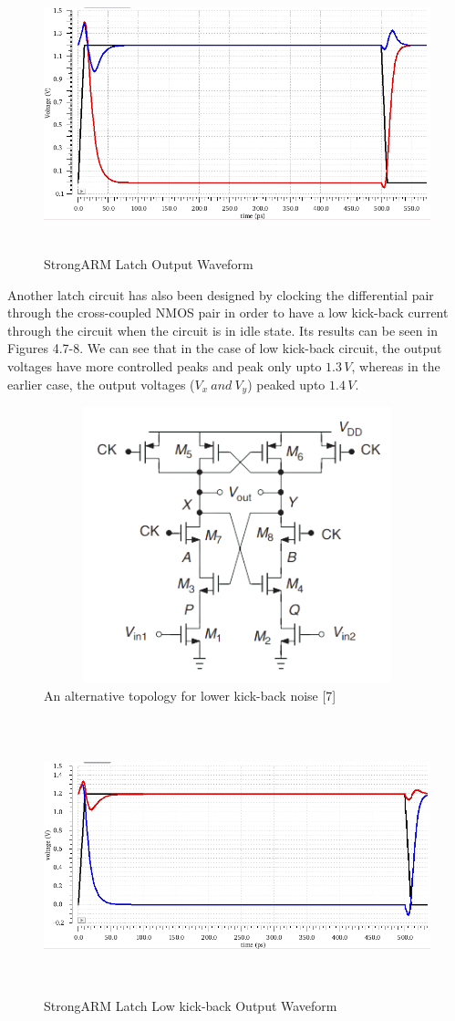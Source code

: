 \begin{figure}[h]
	\centering
	\includegraphics[width=16cm,height=8cm]{fig4_6.png}
	\caption{StrongARM Latch Output Waveform}
	\label{comp_waveform}
\end{figure}

Another latch circuit has also been designed by clocking the differential pair through the cross-coupled NMOS pair in order to have a low kick-back current through the circuit when the circuit is in idle state. Its results can be seen in Figures 4.7-8. We can see that in the case of low kick-back circuit, the output voltages have more controlled peaks and peak only upto $1.3\,V$, whereas in the earlier case, the output voltages (\textbf{$V_{x}\: and \: V_{y}$}) peaked upto $1.4\,V$.

\begin{figure}[h]
	\centering
	\includegraphics[width=12cm,height=8cm]{fig4_7.png}
	\caption{An alternative topology for lower kick-back noise [7]}
	\label{comp_lk_ckt}
\end{figure}

\begin{figure}[h]
	\centering
	\includegraphics[width=16cm,height=8cm]{fig4_8.png}
	\caption{StrongARM Latch Low kick-back Output Waveform}
	\label{comp_lk_waveform}
\end{figure}
\newpage